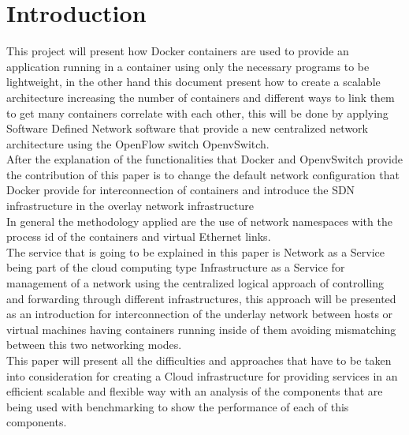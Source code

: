 \chapter{Introduction} %

\label{ch:introduction} %

 
This project will present how Docker containers are used to provide an application running in a container using only the necessary programs to be lightweight, in the other hand this document present how to create a scalable architecture increasing the number of containers and different ways to link them to get many containers correlate with each other, this will be done by applying Software Defined Network software that provide a new centralized network architecture using the OpenFlow switch OpenvSwitch.\\

After the explanation of the functionalities that Docker and OpenvSwitch provide the contribution of this paper is to change the default network configuration that Docker provide for interconnection of containers and introduce the SDN infrastructure in the overlay network infrastructure\\
 
In general the methodology applied are the use of network namespaces with the process id of the containers and virtual Ethernet links. \\
 
The service that is going to be explained in this paper is Network as a Service being part of the cloud computing type Infrastructure as a Service for management of a network using the centralized logical approach of controlling and forwarding through different infrastructures, this approach will be presented as an introduction for interconnection of the underlay network between hosts or virtual machines having containers running inside of them avoiding mismatching between this two networking modes. \\
 
This paper will present all the difficulties and approaches that have to be taken into consideration for creating a Cloud infrastructure for providing services in an efficient scalable and flexible way with an analysis of the components that are being used with benchmarking to show the performance of each of this components.\\
 
